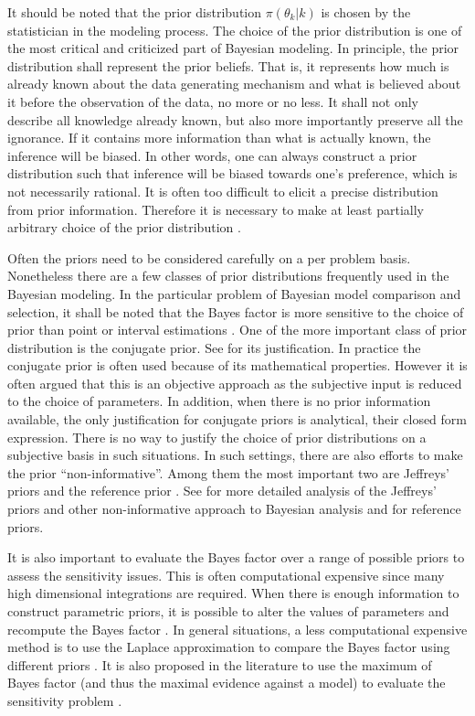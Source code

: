 It should be noted that the prior distribution $\pi(\theta_k|k)$ is
chosen by the statistician in the modeling process. The choice of the prior
distribution is one of the most critical and criticized part of Bayesian
modeling. In principle, the prior distribution shall represent the prior
beliefs. That is, it represents how much is already known about the data
generating mechanism and what is believed about it before the observation of
the data, no more or no less. It shall not only describe all knowledge already
known, but also more importantly preserve all the ignorance. If it contains
more information than what is actually known, the inference will be biased. In
other words, one can always construct a prior distribution such that inference
will be biased towards one's preference, which is not necessarily rational. It
is often too difficult to elicit a precise distribution from prior
information.  Therefore it is necessary to make at least partially arbitrary
choice of the prior distribution
\cites{Robert:2007tc}[][chap.~3]{Kass:1995vb}.

Often the priors need to be considered carefully on a per problem basis.
Nonetheless there are a few classes of prior distributions frequently used in
the Bayesian modeling. In the particular problem of Bayesian model comparison
and selection, it shall be noted that the Bayes factor is more sensitive to
the choice of prior than point or interval estimations \cite{Kass:1993vy,
  Kass:1995vb}. One of the more important class of prior distribution is the
conjugate prior. See \cite[][chap.~5]{Bernardo:1994vd} for its
justification.  In practice the conjugate prior is often used because of its
mathematical properties. However it is often argued that this is an objective
approach as the subjective input is reduced to the choice of parameters. In
addition, when there is no prior information available, the only justification
for conjugate priors is analytical, their closed form expression. There is no
way to justify the choice of prior distributions on a subjective basis in such
situations. In such settings, there are also efforts to make the prior
``non-informative''.  Among them the most important two are Jeffreys' priors
\cite{Jeffreys:1946jf} and the reference prior
\cite{Bernardo:1979uq}. See \cite{Kass:1996jj} for more detailed
analysis of the Jeffreys' priors and other non-informative approach to
Bayesian analysis and \cite{Berger:1989vj, Berger:1992kf, Berger:1992wo}
for reference priors.

It is also important to evaluate the Bayes factor over a range of possible
priors to assess the sensitivity issues. This is often computational expensive
since many high dimensional integrations are required. When there is enough
information to construct parametric priors, it is possible to alter the values
of parameters and recompute the Bayes factor
\cite[e.g.,][]{McCulloch:1991hj}. In general situations, a less
computational expensive method is to use the Laplace approximation to compare
the Bayes factor using different priors \cite[e.g.,][]{Kass:1992tz}. It
is also proposed in the literature to use the maximum of Bayes factor (and
thus the maximal evidence against a model) to evaluate the sensitivity problem
\cite[e.g.,][]{Berger:1987iq}.

